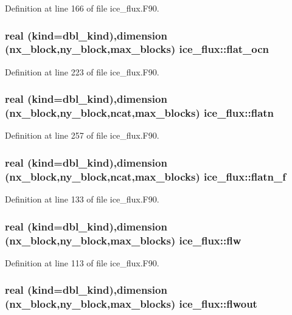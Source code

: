 Definition at line 166 of file ice\_\-flux.F90.\hypertarget{namespaceice__flux_aa7641984ea4c796e511a25d93fd3b86f}{
\subsubsection[{flat\_\-ocn}]{\setlength{\rightskip}{0pt plus 5cm}real (kind=dbl\_\-kind),dimension (nx\_\-block,ny\_\-block,max\_\-blocks) {\bf ice\_\-flux::flat\_\-ocn}}}
\label{namespaceice__flux_aa7641984ea4c796e511a25d93fd3b86f}


Definition at line 223 of file ice\_\-flux.F90.\hypertarget{namespaceice__flux_a43363f554cd27a966c89394ce573135e}{
\subsubsection[{flatn}]{\setlength{\rightskip}{0pt plus 5cm}real (kind=dbl\_\-kind),dimension (nx\_\-block,ny\_\-block,ncat,max\_\-blocks) {\bf ice\_\-flux::flatn}}}
\label{namespaceice__flux_a43363f554cd27a966c89394ce573135e}


Definition at line 257 of file ice\_\-flux.F90.\hypertarget{namespaceice__flux_a5538859203f81cabe03440a3b69f69a4}{
\subsubsection[{flatn\_\-f}]{\setlength{\rightskip}{0pt plus 5cm}real (kind=dbl\_\-kind),dimension (nx\_\-block,ny\_\-block,ncat,max\_\-blocks) {\bf ice\_\-flux::flatn\_\-f}}}
\label{namespaceice__flux_a5538859203f81cabe03440a3b69f69a4}


Definition at line 133 of file ice\_\-flux.F90.\hypertarget{namespaceice__flux_a5a996f0c777a83d0532daa407dae18e5}{
\subsubsection[{flw}]{\setlength{\rightskip}{0pt plus 5cm}real (kind=dbl\_\-kind),dimension (nx\_\-block,ny\_\-block,max\_\-blocks) {\bf ice\_\-flux::flw}}}
\label{namespaceice__flux_a5a996f0c777a83d0532daa407dae18e5}


Definition at line 113 of file ice\_\-flux.F90.\hypertarget{namespaceice__flux_a1ec39d9db775aa2496c0c0ad3ab9c8e4}{
\subsubsection[{flwout}]{\setlength{\rightskip}{0pt plus 5cm}real (kind=dbl\_\-kind),dimension (nx\_\-block,ny\_\-block,max\_\-blocks) {\bf ice\_\-flux::flwout}}}
\label{namespaceice__flux_a1ec39d9db775aa2496c0c0ad3ab9c8e4}


